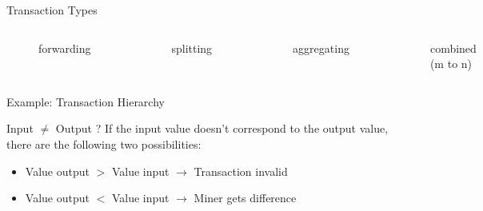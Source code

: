 \documentclass[]{beamer}
\begin{document}
\begin{frame}{Transaction Types}
\begin{columns}

	\vspace{1cm}
	\begin{figure}
		
		\vspace{2.5em}
		\caption*{forwarding}
	\end{figure} 
	\vspace{0.4cm}
	\begin{figure}
		
		\caption*{splitting}
	\end{figure}
	\begin{figure}
		
		\caption*{aggregating}
	\end{figure}
	\vspace{0.5cm}
	\begin{figure}
		
		\caption*{combined (m to n)}
	\end{figure}
	
\end{columns}
\end{frame}

\begin{frame}{Example: Transaction Hierarchy}
\resizebox{\textwidth}{!}{

}
\end{frame}


\begin{frame}{Input $\neq$ Output ?}
If the input value doesn't correspond to the output value, there are the following two possibilities:
\vspace{1em}
\begin{itemize}
    \item<1->{Value output $>$ Value input $\rightarrow$ Transaction invalid}
    \item<2->{Value output $<$ Value input $\rightarrow$ Miner gets difference}
    \end{itemize} 
    \vspace{1.5em}
\begin{center}
\end{center}  
\end{frame}
\end{document}
